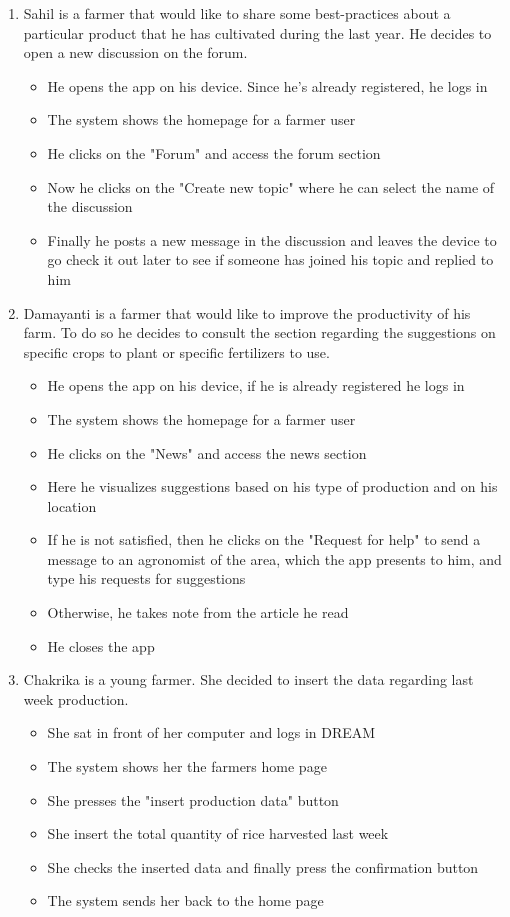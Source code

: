 \documentclass[table, 12pt]{article}
\begin{document}
\begin{enumerate}
    \item Sahil is a farmer that would like to share some best-practices about a particular product that he has cultivated during the last year.
    He decides to open a new discussion on the forum.
    \begin{itemize}
        \item He opens the app on his device. Since he's already registered, he logs in
        \item The system shows the homepage for a farmer user
        \item He clicks on the "Forum" and access the forum section
        \item Now he clicks on the "Create new topic" where he can select the name of the discussion
        \item Finally he posts a new message in the discussion and leaves the device to go check it out later to see if someone has joined his topic and replied to him
    \end{itemize}

    \item Damayanti is a farmer that would like to improve the productivity of his farm.
    To do so he decides to consult the section regarding the suggestions on specific crops to plant or specific fertilizers to use.
    \begin{itemize}
        \item He opens the app on his device, if he is already registered he logs in
        \item The system shows the homepage for a farmer user
        \item He clicks on the "News" and access the news section
        \item Here he visualizes suggestions based on his type of production and on his location
        \item If he is not satisfied, then he clicks on the "Request for help" to send a message to an agronomist of the area, which the app presents to him, and type his requests for suggestions
        \item Otherwise, he takes note from the article he read
        \item He closes the app
    \end{itemize}

    \item Chakrika is a young farmer. She decided to insert the data regarding last week production.
    \begin{itemize}
        \item She sat in front of her computer and logs in DREAM
        \item The system shows her the farmers home page
        \item She presses the "insert production data" button
        \item She insert the total quantity of rice harvested last week 
        \item She checks the inserted data and finally press the confirmation button 
        \item The system sends her back to the home page
    \end{itemize}


\end{enumerate}
\end{document}

